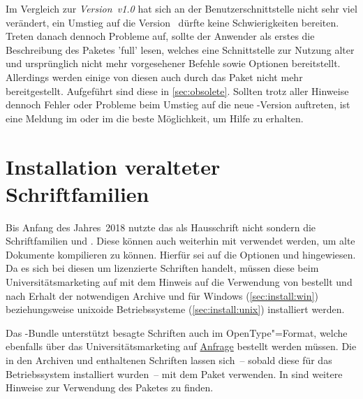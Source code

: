 Im Vergleich zur \emph{Version~v1.0} hat sich an der Benutzerschnittstelle 
nicht sehr viel verändert, ein Umstieg auf die Version~\vTUDScript{} dürfte 
keine Schwierigkeiten bereiten. Treten danach dennoch Probleme auf, sollte der 
Anwender als erstes die Beschreibung des Paketes 'full' 
lesen, welches eine Schnittstelle zur Nutzung alter und ursprünglich nicht mehr 
vorgesehener Befehle sowie Optionen bereitstellt. Allerdings werden einige von 
diesen auch durch das Paket  nicht mehr bereitgestellt. 
Aufgeführt sind diese in \autoref{sec:obsolete}. Sollten trotz aller Hinweise 
dennoch Fehler oder Probleme beim Umstieg auf die neue \TUDScript-Version 
auftreten, ist eine Meldung im \Forum oder im \GitHubRepo[issues] die beste 
Möglichkeit, um Hilfe zu erhalten.



\section{Installation veralteter Schriftfamilien}
%
%

Bis Anfang des Jahres~2018 nutzte das \TUDCD als Hausschrift nicht \OpenSans 
sondern die Schriftfamilien \Univers und \DIN. Diese können auch weiterhin mit 
\TUDScript verwendet werden, um alte Dokumente kompilieren zu können. Hierfür 
sei auf die Optionen  und  
hingewiesen. Da es sich bei diesen um lizenzierte Schriften handelt, müssen 
diese beim Universitätsmarketing auf  
mit dem Hinweis auf die Verwendung von  bestellt und nach Erhalt 
der notwendigen Archive  und  für 
Windows (\autoref{sec:install:win}) beziehungsweise unixoide Betriebssysteme 
(\autoref{sec:install:unix}) installiert werden. 

Das \TUDScript-Bundle unterstützt besagte Schriften auch im OpenType"=Format, 
welche ebenfalls über das Universitätsmarketing auf 
\href{https://tu-dresden.de/cd/}{Anfrage} bestellt werden müssen. Die in den 
Archiven  und  enthaltenen 
Schriften lassen sich~-- sobald diese für das Betriebssystem installiert 
wurden~-- mit dem Paket  verwenden. In  
sind weitere Hinweise zur Verwendung des Paketes  zu finden.

